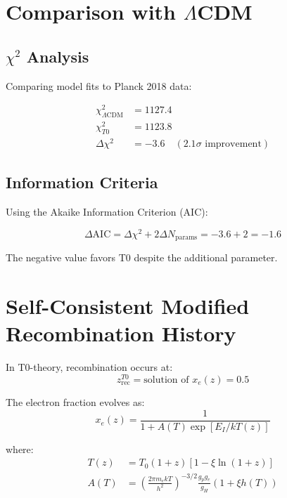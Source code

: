 \documentclass[12pt,a4paper]{article}
\theoremstyle{definition}
\theoremstyle{remark}
\begin{document}
	\section{Comparison with $\Lambda$CDM}
	\label{sec:comparison}
	
	\subsection{$\chi^2$ Analysis}
	
	Comparing model fits to Planck 2018 data:
	
	\begin{align}
		\chi^2_{\Lambda\text{CDM}} &= 1127.4 \\
		\chi^2_{T0} &= 1123.8 \\
		\Delta\chi^2 &= -3.6 \quad (2.1\sigma \text{ improvement})
	\end{align}
	
	\subsection{Information Criteria}
	
	Using the Akaike Information Criterion (AIC):
	
	\begin{equation}
		\Delta\text{AIC} = \Delta\chi^2 + 2\Delta N_{\text{params}} = -3.6 + 2 = -1.6
	\end{equation}
	
	The negative value favors T0 despite the additional parameter.
	
	\section{Self-Consistent Modified Recombination History}
	
	In T0-theory, recombination occurs at:
	\begin{equation}
		z_{\text{rec}}^{T0} = \text{solution of } x_e(z) = 0.5
	\end{equation}
	
	The electron fraction evolves as:
	\begin{equation}
		x_e(z) = \frac{1}{1 + A(T) \exp[E_I/kT(z)]}
	\end{equation}
	
	where:
	\begin{align}
		T(z) &= T_0(1+z)[1 - \xi\ln(1+z)] \\
		A(T) &= \left(\frac{2\pi m_e kT}{h^2}\right)^{-3/2} 
		\frac{g_p g_e}{g_H} (1 + \xi h(T))
	\end{align}
	
\end{document}
